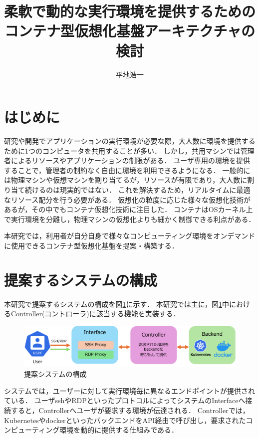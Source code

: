 \documentclass[dvipdfmx]{cs-handout}
\title{柔軟で動的な実行環境を提供するための\\コンテナ型仮想化基盤アーキテクチャの検討}
\author{平地浩一}
\newcommand{\Note}[1]{\noindent \textbf{\textcolor{blue}{#1}}}
\begin{document}
\maketitle

\section{はじめに}

研究や開発でアプリケーションの実行環境が必要な際，大人数に環境を提供するために1つのコンピュータを共用することが多い．
しかし，共用マシンでは管理者によるリソースやアプリケーションの制限がある．
ユーザ専用の環境を提供することで，管理者の制約なく自由に環境を利用できるようになる．
一般的には物理マシンや仮想マシンを割り当てるが，リソースが有限であり，大人数に割り当て続けるのは現実的ではない．
これを解決するため，リアルタイムに最適なリソース配分を行う必要がある．
仮想化の粒度に応じた様々な仮想化技術があるが，その中でもコンテナ仮想化技術に注目した．
コンテナはOSカーネル上で実行環境を分離し，物理マシンの仮想化よりも細かく制御できる利点がある．

本研究では，利用者が自分自身で様々なコンピューティング環境をオンデマンドに使用できるコンテナ型仮想化基盤を提案・構築する．

\section{提案するシステムの構成}

本研究で提案するシステムの構成を図\ref{fig:system}に示す．
本研究では主に，図\ref{fig:system}中におけるController(コントローラ)に該当する機能を実装する．
%
\begin{figure}[htbp]
\includegraphics[width=\linewidth]{./fig/simple.png}
\caption{提案システムの構成}
\label{fig:system}
\end{figure}
%

システムでは，ユーザーに対して実行環境毎に異なるエンドポイントが提供されている．
ユーザsshやRDPといったプロトコルによってシステムのInterfaceへ接続すると，Controllerへユーザが要求する環境が伝達される．
Controllerでは，KubernetesやdockerといったバックエンドをAPI経由で呼び出し，要求されたコンピューティング環境を動的に提供する仕組みである．
\end{document}
